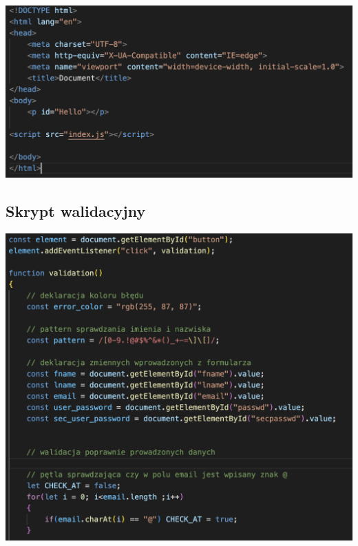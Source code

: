 \documentclass[12pt, letterpaper]{article}
\begin{document}
\begin{center}
	\includegraphics[scale=0.5]{hello}
\end{center}

\subsection{Skrypt walidacyjny}

\begin{center}
	\includegraphics[scale=0.5]{js1}
\end{center}
\end{document}
